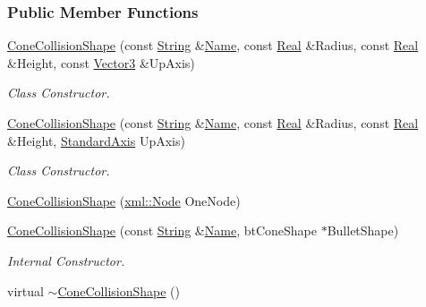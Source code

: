 \subsubsection*{Public Member Functions}
\begin{DoxyCompactItemize}
\item 
\hyperlink{classMezzanine_1_1ConeCollisionShape_aec0129e435def8d4299a6a7df6ecfd82}{ConeCollisionShape} (const \hyperlink{namespaceMezzanine_acf9fcc130e6ebf08e3d8491aebcf1c86}{String} \&\hyperlink{classMezzanine_1_1CollisionShape_aac524c5c56fa4d158bc071f8aecfbe79}{Name}, const \hyperlink{namespaceMezzanine_a726731b1a7df72bf3583e4a97282c6f6}{Real} \&Radius, const \hyperlink{namespaceMezzanine_a726731b1a7df72bf3583e4a97282c6f6}{Real} \&Height, const \hyperlink{classMezzanine_1_1Vector3}{Vector3} \&UpAxis)
\begin{DoxyCompactList}\small\item\em Class Constructor. \item\end{DoxyCompactList}\item 
\hyperlink{classMezzanine_1_1ConeCollisionShape_a33a0f529da45a509f8961f4c9a490b3e}{ConeCollisionShape} (const \hyperlink{namespaceMezzanine_acf9fcc130e6ebf08e3d8491aebcf1c86}{String} \&\hyperlink{classMezzanine_1_1CollisionShape_aac524c5c56fa4d158bc071f8aecfbe79}{Name}, const \hyperlink{namespaceMezzanine_a726731b1a7df72bf3583e4a97282c6f6}{Real} \&Radius, const \hyperlink{namespaceMezzanine_a726731b1a7df72bf3583e4a97282c6f6}{Real} \&Height, \hyperlink{namespaceMezzanine_ab41a00a8c6a47b576dc987ec34e16ba1}{StandardAxis} UpAxis)
\begin{DoxyCompactList}\small\item\em Class Constructor. \item\end{DoxyCompactList}\item 
\hyperlink{classMezzanine_1_1ConeCollisionShape_ad011298b1fa5ece04c3572d3eec74dfa}{ConeCollisionShape} (\hyperlink{classMezzanine_1_1xml_1_1Node}{xml::Node} OneNode)
\item 
\hyperlink{classMezzanine_1_1ConeCollisionShape_ad80439a195cf4f2df8d2cd4b8ebaf062}{ConeCollisionShape} (const \hyperlink{namespaceMezzanine_acf9fcc130e6ebf08e3d8491aebcf1c86}{String} \&\hyperlink{classMezzanine_1_1CollisionShape_aac524c5c56fa4d158bc071f8aecfbe79}{Name}, btConeShape $\ast$BulletShape)
\begin{DoxyCompactList}\small\item\em Internal Constructor. \item\end{DoxyCompactList}\item 
\hypertarget{classMezzanine_1_1ConeCollisionShape_a49236a6396e87f22ec06251de6d3c1fe}{
virtual \hyperlink{classMezzanine_1_1ConeCollisionShape_a49236a6396e87f22ec06251de6d3c1fe}{$\sim$ConeCollisionShape} ()}
\label{classMezzanine_1_1ConeCollisionShape_a49236a6396e87f22ec06251de6d3c1fe}


\end{DoxyCompactItemize}
